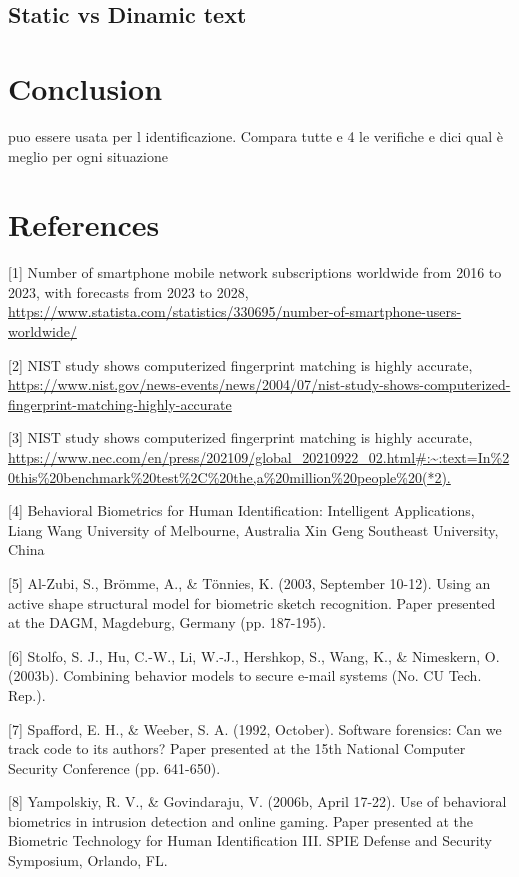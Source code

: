 \documentclass{article}
\begin{document}
\FloatBarrier


\subsection{Static vs Dinamic text}
\label{subsec:s_vs_d}


\newpage
\section{Conclusion}
puo essere usata per l identificazione.
Compara tutte e 4 le verifiche e dici qual è meglio per ogni situazione
\newpage

\section{References}
\begin{raggedright}

[1] Number of smartphone mobile network subscriptions worldwide from 2016 to 2023, with forecasts from 2023 to 2028, \url{https://www.statista.com/statistics/330695/number-of-smartphone-users-worldwide/}

[2] NIST study shows computerized fingerprint matching is highly accurate, \url{https://www.nist.gov/news-events/news/2004/07/nist-study-shows-computerized-fingerprint-matching-highly-accurate}

[3] NIST study shows computerized fingerprint matching is highly accurate, \url{https://www.nec.com/en/press/202109/global_20210922_02.html#:~:text=In%20this%20benchmark%20test%2C%20the,a%20million%20people%20(*2).}

[4] Behavioral Biometrics for Human Identification: Intelligent Applications, Liang Wang University of Melbourne, Australia Xin Geng Southeast University, China

[5] Al-Zubi, S., Brömme, A., \& Tönnies, K. (2003, September 10-12). Using an active shape structural model for biometric sketch recognition. Paper presented at the DAGM, Magdeburg, Germany (pp. 187-195).

[6] Stolfo, S. J., Hu, C.-W., Li, W.-J., Hershkop, S., Wang, K., \& Nimeskern, O. (2003b). Combining behavior models to secure e-mail systems (No. CU Tech. Rep.). 

[7] Spafford, E. H., \& Weeber, S. A. (1992, October). Software forensics: Can we track code to its authors? Paper presented at the 15th National Computer Security Conference (pp. 641-650).

[8] Yampolskiy, R. V., \& Govindaraju, V. (2006b, April 17-22). Use of behavioral biometrics in intrusion detection and online gaming. Paper presented at the Biometric Technology for Human Identification III. SPIE Defense and Security Symposium, Orlando, FL.


\end{raggedright}
\end{document}
